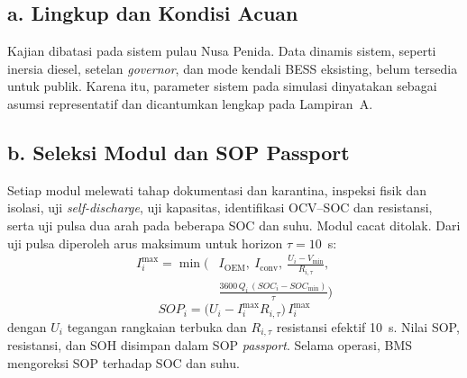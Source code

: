\documentclass[12pt,a4paper,twocolumn]{article}
\newcommand{\eng}[1]{\textit{#1}}
\begin{document}
\subsection{a. Lingkup dan Kondisi Acuan}
Kajian dibatasi pada sistem pulau Nusa Penida. Data dinamis sistem, seperti inersia diesel, setelan \eng{governor}, dan mode kendali BESS eksisting, belum tersedia untuk publik. Karena itu, parameter sistem pada simulasi dinyatakan sebagai asumsi representatif dan dicantumkan lengkap pada Lampiran~A.

\subsection{b. Seleksi Modul dan SOP Passport}
Setiap modul melewati tahap dokumentasi dan karantina, inspeksi fisik dan isolasi, uji \eng{self-discharge}, uji kapasitas, identifikasi OCV--SOC dan resistansi, serta uji pulsa dua arah pada beberapa SOC dan suhu. Modul cacat ditolak. Dari uji pulsa diperoleh arus maksimum untuk horizon $\tau=10$~s:
\begin{equation}
\begin{aligned}
I_i^{\max}=\min\Big(&I_{\mathrm{OEM}},\ I_{\mathrm{conv}},\ \frac{U_i-V_{\min}}{R_{i,\tau}},\\
&\frac{3600\,Q_i\,(SOC_i-SOC_{\min})}{\tau}\Big)
\end{aligned}
\end{equation}
\begin{equation}
SOP_i=\big(U_i-I_i^{\max}R_{i,\tau}\big)\,I_i^{\max}
\end{equation}
dengan $U_i$ tegangan rangkaian terbuka dan $R_{i,\tau}$ resistansi efektif 10~s. Nilai SOP, resistansi, dan SOH disimpan dalam SOP \eng{passport}. Selama operasi, BMS mengoreksi SOP terhadap SOC dan suhu.
\end{document}
